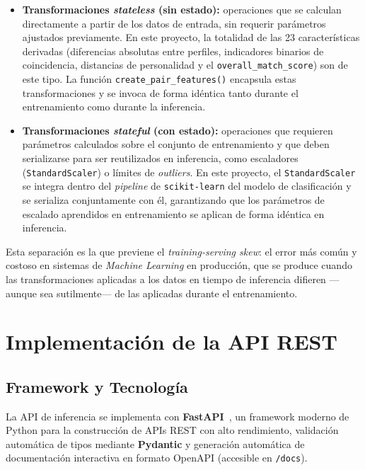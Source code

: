 \begin{itemize}
    \item \textbf{Transformaciones \textit{stateless} (sin estado):} operaciones que se calculan directamente a partir de los datos de entrada, sin requerir parámetros ajustados previamente. En este proyecto, la totalidad de las 23 características derivadas (diferencias absolutas entre perfiles, indicadores binarios de coincidencia, distancias de personalidad y el \texttt{overall\_match\_score}) son de este tipo. La función \texttt{create\_pair\_features()} encapsula estas transformaciones y se invoca de forma idéntica tanto durante el entrenamiento como durante la inferencia.

    \item \textbf{Transformaciones \textit{stateful} (con estado):} operaciones que requieren parámetros calculados sobre el conjunto de entrenamiento y que deben serializarse para ser reutilizados en inferencia, como escaladores (\texttt{StandardScaler}) o límites de \textit{outliers}. En este proyecto, el \texttt{StandardScaler} se integra dentro del \textit{pipeline} de \texttt{scikit-learn} del modelo de clasificación y se serializa conjuntamente con él, garantizando que los parámetros de escalado aprendidos en entrenamiento se aplican de forma idéntica en inferencia.
\end{itemize}

Esta separación es la que previene el \textit{training-serving skew}: el error más común y costoso en sistemas de \textit{Machine Learning} en producción, que se produce cuando las transformaciones aplicadas a los datos en tiempo de inferencia difieren —aunque sea sutilmente— de las aplicadas durante el entrenamiento.

\section{Implementación de la API REST}
\label{sec:api_rest}

\subsection{Framework y Tecnología}
\label{subsec:framework}

La API de inferencia se implementa con \textbf{FastAPI}~\cite{fastapi}, un framework moderno de Python para la construcción de APIs REST con alto rendimiento, validación automática de tipos mediante \textbf{Pydantic} y generación automática de documentación interactiva en formato OpenAPI (accesible en \texttt{/docs}).

